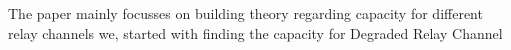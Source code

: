 \documentclass[preview]{standalone}
\begin{document}
\begin{center}
The paper mainly focusses on building theory regarding capacity for different relay channels we, started with finding the capacity for Degraded Relay Channel
\end{center}
\end{document}
